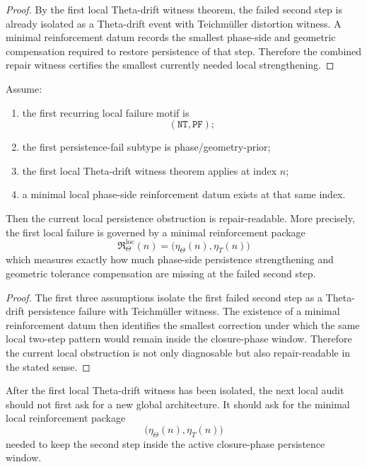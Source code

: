 \begin{proof}
By the first local Theta-drift witness theorem, the failed second step is already isolated as a Theta-drift event with Teichm\"uller distortion witness.
A minimal reinforcement datum records the smallest phase-side and geometric compensation required to restore persistence of that step.
Therefore the combined repair witness certifies the smallest currently needed local strengthening.
\end{proof}

\begin{theorem}
\label{thm:first-local-phase-side-repair-theorem}
Assume:
\begin{enumerate}
    \item the first recurring local failure motif is
    \[
    (\mathtt{NT},\mathtt{PF});
    \]
    \item the first persistence-fail subtype is phase/geometry-prior;
    \item the first local Theta-drift witness theorem applies at index $n$;
    \item a minimal local phase-side reinforcement datum exists at that same index.
\end{enumerate}
Then the current local persistence obstruction is repair-readable.
More precisely, the first local failure is governed by a minimal reinforcement package
\[
\mathfrak{R}_{\Theta}^{\mathrm{loc}}(n)
=
\bigl(
\eta_{\Theta}(n),
\eta_{T}(n)
\bigr)
\]
which measures exactly how much phase-side persistence strengthening and geometric tolerance compensation are missing at the failed second step.
\end{theorem}

\begin{proof}
The first three assumptions isolate the first failed second step as a Theta-drift persistence failure with Teichm\"uller witness.
The existence of a minimal reinforcement datum then identifies the smallest correction under which the same local two-step pattern would remain inside the closure-phase window.
Therefore the current local obstruction is not only diagnosable but also repair-readable in the stated sense.
\end{proof}

\begin{corollary}
\label{cor:current-post-r20-repair-rule}
After the first local Theta-drift witness has been isolated, the next local audit should not first ask for a new global architecture.
It should ask for the minimal local reinforcement package
\[
\bigl(
\eta_{\Theta}(n),
\eta_{T}(n)
\bigr)
\]
needed to keep the second step inside the active closure-phase persistence window.
\end{corollary}

